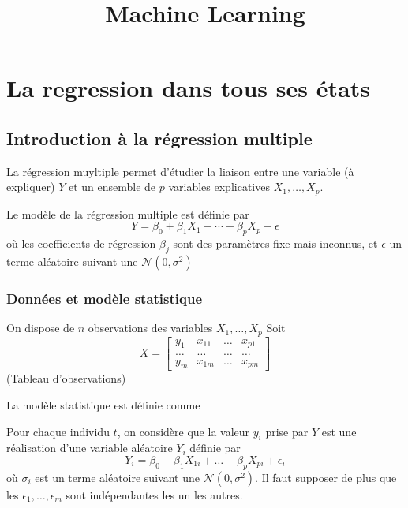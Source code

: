 \documentclass{article}
\title{Machine Learning}
\begin{document}
\maketitle
\pagebreak
\section{La regression dans tous ses \'etats}
\subsection{Introduction \`a la r\'egression multiple}
La r\'egression muyltiple permet d'\'etudier la liaison entre une variable (\`a expliquer) $Y$ et un ensemble de $p$ variables explicatives $X_1,\ldots,X_p$.

Le mod\`ele de la r\'egression multiple est d\'efinie par
\begin{equation}
Y=\beta_0+\beta_1 X_1 +\cdots+\beta_p X_p+\epsilon
\end{equation}
o\`u les coefficients de r\'egression $\beta_j$ sont des param\`etres fixe mais inconnus, et $\epsilon$ un terme al\'eatoire suivant une $\mathcal{N}(0,\sigma^2)$

\subsubsection{Donn\'ees et mod\`ele statistique}

On dispose de $n$ observations des variables $X_1,\ldots,X_p$
Soit 
\begin{equation}
X=\left[
\begin{array}{cccc}
y_1 & x_{11} & \ldots & x_{p1} \\
\ldots & \ldots & \ldots & \ldots \\
y_m & x_{1m} & \ldots & x_{pm}
\end{array}\right]
\end{equation}
(Tableau d'observations)

La mod\`ele statistique est d\'efinie comme 

Pour chaque individu $t$, on consid\`ere que la valeur $y_i$ prise par $Y$ est une r\'ealisation d'une variable al\'eatoire $Y_i$ d\'efinie par 
\begin{equation}
Y_i=\beta_0+\beta_1 X_{1i}+\ldots+\beta_p X_{pi}+\epsilon_i
\end{equation}
o\`u $\sigma_i$ est un terme al\'eatoire suivant une $\mathcal{N}(0,\sigma^2)$. Il faut supposer de plus que les $\epsilon_1,\ldots,\epsilon_m$ sont ind\'ependantes les un les autres.
\end{document}
